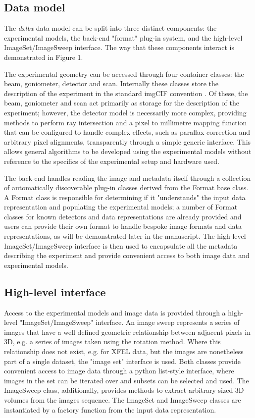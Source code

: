 \documentclass[preprint]{iucr}
\newcommand{\dxtbx}{\emph{dxtbx}\xspace}
\begin{document}
\subsection{Data model}

The \dxtbx data model can be split into three distinct components: the 
experimental models, the back-end "format" plug-in system, and the high-level 
ImageSet/ImageSweep interface. The way that these components interact is 
demonstrated in Figure 1.

The experimental geometry can be accessed through four container classes: the 
beam, goniometer, detector and scan. Internally these classes store the 
description of the experiment in the standard imgCIF convention \cite{Bernstein2005}. 
Of these, the beam, goniometer and scan act primarily as storage for the 
description of the experiment; however, the detector model is necessarily more 
complex, providing methods to perform ray intersection and a pixel to millimetre 
mapping function that can be configured to handle complex effects, such as 
parallax correction and arbitrary pixel alignments, transparently through a 
simple generic interface. This allows general algorithms to be developed using 
the experimental models without reference to the specifics of the experimental 
setup and hardware used. 

The back-end handles reading the image and metadata itself through a collection 
of automatically discoverable plug-in classes derived from the Format base 
class. A Format class is responsible for determining if it "understands" the 
input data representation and populating the experimental models; a number of 
Format classes for known detectors and data representations are already provided 
and users can provide their own format to handle bespoke image formats and data 
representations, as will be demonstrated later in the manuscript. The high-level 
ImageSet/ImageSweep interface is then used to encapsulate all the metadata 
describing the experiment and provide convenient access to both image data and 
experimental models.

\subsection{High-level interface}

Access to the experimental models and image data is provided through a high-level 
"ImageSet/ImageSweep" interface. An image sweep represents a series of images 
that have a well defined geometric relationship between adjacent pixels in 3D, 
e.g. a series of images taken using the rotation method. Where this relationship 
does not exist, e.g. for XFEL data, but the images are nonetheless part of a 
single dataset, the "image set" interface is used. Both classes provide 
convenient access to image data through a python list-style interface, where 
images in the set can be iterated over and subsets can be selected and used. 
The ImageSweep class, additionally, provides methods to extract arbitrary sized 
3D volumes from the images sequence. The ImageSet and ImageSweep classes are 
instantiated by a factory function from the input data representation.  
\end{document}
